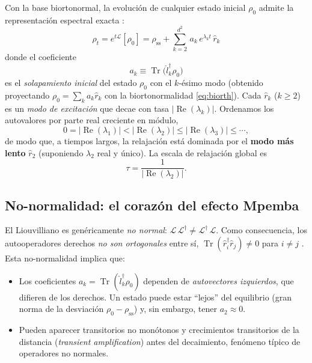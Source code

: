 \documentclass[11pt,a4paper]{article}
\theoremstyle{definition}
\theoremstyle{plain}
\newcommand{\Lop}{\mathcal{L}}
\newcommand{\Ldual}{\mathcal{L}^{\dagger}}
\newcommand{\rss}{\rho_{\mathrm{ss}}}
\renewcommand{\Tr}{\operatorname{Tr}}
\begin{document}
Con la base biortonormal, la evolución de cualquier estado inicial $\rho_0$ admite la representación
espectral exacta \cite{Carollo2021,LiYang2026,Chattopadhyay2026}:
\begin{equation}
\boxed{\;
\rho_t=e^{t\Lop}[\rho_0]
=\rss+\sum_{k=2}^{d^2}\, a_k\, e^{\lambda_k t}\,\hat r_k \;}
\label{eq:spectral}
\end{equation}
donde el coeficiente
\begin{equation}
a_k\equiv\Tr\!\big(\hat l_k^{\dagger}\rho_0\big)
\label{eq:overlap}
\end{equation}
es el \emph{solapamiento inicial} del estado $\rho_0$ con el $k$-ésimo modo
(obtenido proyectando $\rho_0=\sum_k a_k\hat r_k$ con la biortonormalidad
\eqref{eq:biorth}). Cada $\hat r_k$ ($k\ge2$) es un \emph{modo de excitación} que
decae con tasa $|\!\operatorname{Re}(\lambda_k)|$.
Ordenamos los autovalores por parte real creciente en módulo,
\begin{equation}
0=|\operatorname{Re}(\lambda_1)| < |\operatorname{Re}(\lambda_2)| \le |\operatorname{Re}(\lambda_3)| \le\cdots,
\end{equation}
de modo que, a tiempos largos, la relajación está dominada por el \textbf{modo más lento} $\hat r_2$
(suponiendo $\lambda_2$ real y único). La escala de relajación global es
\begin{equation}
\tau=\frac{1}{|\operatorname{Re}(\lambda_2)|}.
\label{eq:tau}
\end{equation}

\subsection{No-normalidad: el corazón del efecto Mpemba}

El Liouvilliano es genéricamente \emph{no normal}: $\Lop\,\Ldual\neq\Ldual\,\Lop$. Como consecuencia, los
autooperadores derechos \emph{no son ortogonales} entre sí, $\Tr(\hat r_i^{\dagger}\hat r_j)\neq0$ para
$i\neq j$ \cite{LiYang2026,Minganti2018}. Esta no-normalidad implica que:
\begin{itemize}[leftmargin=1.6em,itemsep=2pt]
\item Los coeficientes $a_k=\Tr(\hat l_k^{\dagger}\rho_0)$ dependen de \emph{autovectores izquierdos}, que
difieren de los derechos. Un estado puede estar ``lejos'' del equilibrio (gran norma de la desviación
$\rho_0-\rss$) y, sin embargo, tener $a_2\approx0$.
\item Pueden aparecer transitorios no monótonos y crecimientos transitorios de la distancia
(\emph{transient amplification}) antes del decaimiento, fenómeno típico de operadores no normales.
\end{itemize}
\end{document}
